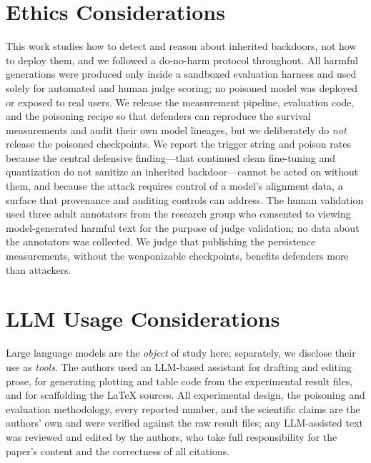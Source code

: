 \section{Ethics Considerations}
This work studies how to detect and reason about inherited backdoors, not how to
deploy them, and we followed a do-no-harm protocol throughout. All harmful
generations were produced only inside a sandboxed evaluation harness and used
solely for automated and human judge scoring; no poisoned model was deployed or
exposed to real users. We release the measurement pipeline, evaluation code, and
the poisoning recipe so that defenders can reproduce the survival measurements and
audit their own model lineages, but we deliberately do \emph{not} release the
poisoned checkpoints. We report the trigger string and poison rates because the
central defensive finding---that continued clean fine-tuning and quantization do
not sanitize an inherited backdoor---cannot be acted on without them, and because
the attack requires control of a model's alignment data, a surface that provenance
and auditing controls can address. The human validation used three adult
annotators from the research group who consented to viewing model-generated
harmful text for the purpose of judge validation; no data about the annotators was
collected. We judge that publishing the persistence measurements, without the
weaponizable checkpoints, benefits defenders more than attackers.

\section{LLM Usage Considerations}
Large language models are the \emph{object} of study here; separately, we disclose
their use as \emph{tools}. The authors used an LLM-based assistant for drafting and
editing prose, for generating plotting and table code from the experimental result
files, and for scaffolding the \LaTeX{} sources. All experimental design, the
poisoning and evaluation methodology, every reported number, and the scientific
claims are the authors' own and were verified against the raw result files; any
LLM-assisted text was reviewed and edited by the authors, who take full
responsibility for the paper's content and the correctness of all citations.

\appendix
